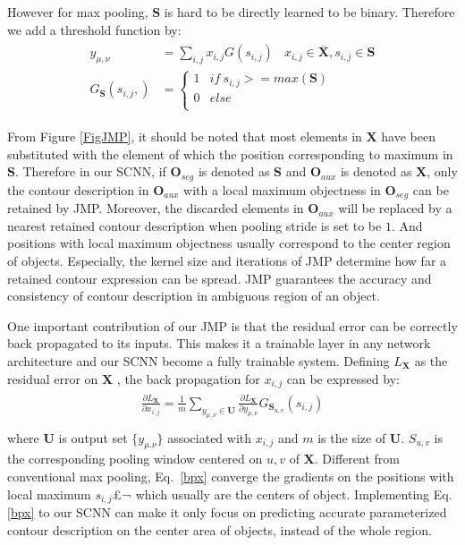 However for max pooling, $\mathbf{S}$ is hard to be directly learned to be binary.
Therefore we add a threshold function by:
\begin{eqnarray}\label{jmp}
\begin{aligned}
y_{\mu,\nu} &= \sum_{i,j}x_{i,j}G(s_{i,j})~~~~x_{i,j}\in \mathbf{\overline{X}},s_{i,j}\in \mathbf{S} \\
G_{\mathbf{S}}(s_{i,j},)&=\left\{\begin{array}{cc}
1&if~s_{i,j}>=max(\mathbf{S})\\
0&else\\
\end{array}\right.
\end{aligned}
\end{eqnarray}

From Figure \ref{FigJMP}, it should be noted that most elements in $\mathbf{X}$ have been substituted with the element of which the position corresponding to maximum in $\mathbf{S}$.
Therefore in our SCNN, if $\mathbf{O}_{seg}$ is denoted as $\mathbf{S}$ and $\mathbf{O}_{aux}$ is denoted as $\mathbf{X}$, only the contour description in $\mathbf{O}_{aux}$ with a local maximum objectness in $\mathbf{O}_{seg}$ can be retained by JMP.
Moreover, the discarded elements in $\mathbf{O}_{aux}$ will be replaced by a nearest retained contour description when pooling stride is set to be $1$.
%
And positions with local maximum objectness usually correspond to the center region of objects.
Especially, the kernel size and iterations of JMP determine how far a retained contour expression can be spread.
JMP guarantees the accuracy and consistency of contour description in ambiguous region of an object.

One important contribution of our JMP is that the residual error can be correctly back propagated to its inputs.
This makes it a trainable layer in any network architecture and our SCNN become a fully trainable system.
Defining $L_\mathbf{X}$ as the residual error on $\mathbf{X}$ , the back propagation for $x_{i,j}$ can be expressed by:
\begin{eqnarray}\label{bpx}
\begin{aligned}
\frac{\partial L_\mathbf{X}}{\partial x_{i,j}}=\frac{1}{m}\sum\limits_{y_{\mu,\nu}\in\mathbf{U}}\frac{\partial L_\mathbf{X}}{\partial y_{\mu,\nu}}G_{\mathbf{S}_{u,v}}(s_{i,j})\\
\end{aligned}
\end{eqnarray}
where $\mathbf{U}$ is output set $\{y_{\mu.\nu}\}$ associated with $x_{i,j}$ and $m$ is the size of $\mathbf{U}$.
${S}_{u,v}$ is the corresponding pooling window centered on ${u,v}$ of $\mathbf{X}$.
Different from conventional max pooling, Eq.~\ref{bpx} converge the gradients on the positions with local maximum $s_{i,j}$£¬ which usually are the centers of object.
%
Implementing Eq. \ref{bpx} to our SCNN can make it only focus on predicting accurate parameterized contour description on the center area of objects, instead of the whole region.


